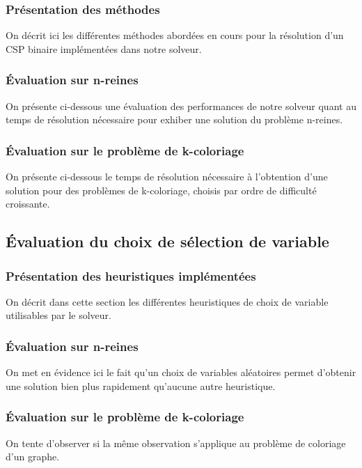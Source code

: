 \documentclass[14pt]{article}
\begin{document}
\subsubsection{Présentation des méthodes}

On décrit ici les différentes méthodes abordées en cours pour la résolution d'un CSP binaire implémentées dans notre solveur.

\subsubsection{Évaluation sur n-reines}

On présente ci-dessous une évaluation des performances de notre solveur quant au temps de résolution nécessaire pour exhiber une solution du problème n-reines.

\subsubsection{Évaluation sur le problème de k-coloriage}

On présente ci-dessous le temps de résolution nécessaire à l'obtention d'une solution pour des problèmes de k-coloriage, choisis par ordre de difficulté croissante.

\subsection{Évaluation du choix de sélection de variable}

\subsubsection{Présentation des heuristiques implémentées}

On décrit dans cette section les différentes heuristiques de choix de variable utilisables par le solveur.

\subsubsection{Évaluation sur n-reines}

On met en évidence ici le fait qu'un choix de variables aléatoires permet d'obtenir une solution bien plus rapidement qu'aucune autre heuristique.

\subsubsection{Évaluation sur le problème de k-coloriage}

On tente d'observer si la même observation s'applique au problème de coloriage d'un graphe.

\end{document}
